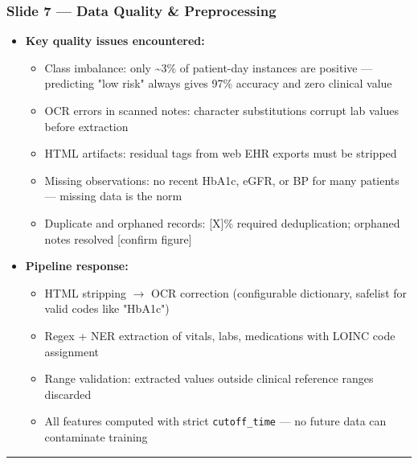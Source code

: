 \documentclass[11pt,a4paper]{article}
\begin{document}
\subsubsection{Slide 7 --- Data Quality \& Preprocessing}
\begin{itemize}
\item \textbf{Key quality issues encountered:}
\begin{itemize}
\item Class imbalance: only \textasciitilde{}3\% of patient-day instances are positive --- predicting "low risk" always gives 97\% accuracy and zero clinical value
\item OCR errors in scanned notes: character substitutions corrupt lab values before extraction
\item HTML artifacts: residual tags from web EHR exports must be stripped
\item Missing observations: no recent HbA1c, eGFR, or BP for many patients --- missing data is the norm
\item Duplicate and orphaned records: [X]\% required deduplication; orphaned notes resolved [confirm figure]
\end{itemize}
\item \textbf{Pipeline response:}
\begin{itemize}
\item HTML stripping $\rightarrow$ OCR correction (configurable dictionary, safelist for valid codes like "HbA1c")
\item Regex + NER extraction of vitals, labs, medications with LOINC code assignment
\item Range validation: extracted values outside clinical reference ranges discarded
\item All features computed with strict \texttt{cutoff\_time} --- no future data can contaminate training
\end{itemize}
\end{itemize}

\noindent\rule{\linewidth}{0.4pt}
\end{document}
